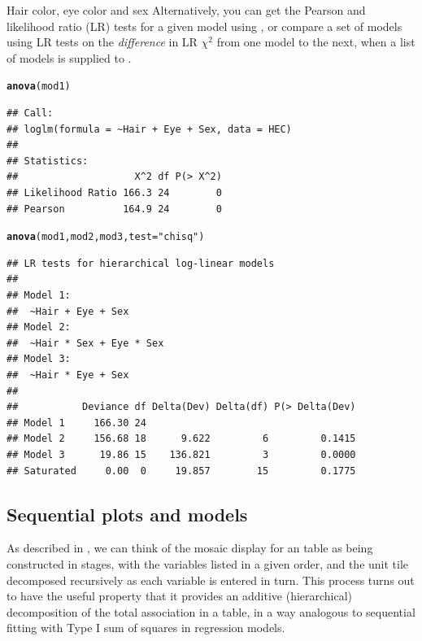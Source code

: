 \documentclass[11pt]{book}\usepackage[]{graphicx}\usepackage[]{color}
\makeatletter
\newcommand{\hlstr}[1]{\textcolor[rgb]{0.192,0.494,0.8}{#1}}%
\newcommand{\hlstd}[1]{\textcolor[rgb]{0.345,0.345,0.345}{#1}}%
\newcommand{\hlkwc}[1]{\textcolor[rgb]{0.333,0.667,0.333}{#1}}%
\newcommand{\hlkwd}[1]{\textcolor[rgb]{0.737,0.353,0.396}{\textbf{#1}}}%
\newenvironment{kframe}{%
 \def\at@end@of@kframe{}%
 \ifinner\ifhmode%
  \def\at@end@of@kframe{\end{minipage}}%
  \begin{minipage}{\columnwidth}%
 \fi\fi%
 \def\FrameCommand##1{\hskip\@totalleftmargin \hskip-\fboxsep
 \colorbox{shadecolor}{##1}\hskip-\fboxsep
     \hskip-\linewidth \hskip-\@totalleftmargin \hskip\columnwidth}%
 \MakeFramed {\advance\hsize-\width
   \@totalleftmargin\z@ \linewidth\hsize
   \@setminipage}}%
 {\par\unskip\endMakeFramed%
 \at@end@of@kframe}
\newenvironment{knitrout}{}{} %
\renewenvironment{knitrout}{\small\renewcommand{\baselinestretch}{.85}}{} %
\makeatother
\begin{document}
\begin{Example}[HEC2]{Hair color, eye color and sex}
Alternatively, you can get the Pearson and likelihood ratio (LR) tests
for a given model using ,
or compare a set of models using LR tests on the \emph{difference} in
LR $\chi^2$ from one model to the next, when a list of models is supplied
to .
\begin{knitrout}
\color{fgcolor}\begin{kframe}
\begin{alltt}
\hlkwd{anova}\hlstd{(mod1)}
\end{alltt}
\begin{verbatim}
## Call:
## loglm(formula = ~Hair + Eye + Sex, data = HEC)
## 
## Statistics:
##                    X^2 df P(> X^2)
## Likelihood Ratio 166.3 24        0
## Pearson          164.9 24        0
\end{verbatim}
\begin{alltt}
\hlkwd{anova}\hlstd{(mod1, mod2, mod3,} \hlkwc{test}\hlstd{=}\hlstr{"chisq"}\hlstd{)}
\end{alltt}
\begin{verbatim}
## LR tests for hierarchical log-linear models
## 
## Model 1:
##  ~Hair + Eye + Sex 
## Model 2:
##  ~Hair * Sex + Eye * Sex 
## Model 3:
##  ~Hair * Eye + Sex 
## 
##           Deviance df Delta(Dev) Delta(df) P(> Delta(Dev)
## Model 1     166.30 24                                    
## Model 2     156.68 18      9.622         6         0.1415
## Model 3      19.86 15    136.821         3         0.0000
## Saturated     0.00  0     19.857        15         0.1775
\end{verbatim}
\end{kframe}
\end{knitrout}


\end{Example}

\subsection{Sequential plots and models}\label{sec:mosaic-seq}

As described in ,
we can think of the mosaic display for an \nway table as being constructed in stages,
with the variables listed in a given order, and the unit tile decomposed recursively
as each variable is entered in turn.  This process turns out to have the useful property
that it provides an additive (hierarchical) decomposition of the total association in a table,
in a way analogous to sequential fitting with Type I sum of squares in regression models.
\end{document}
